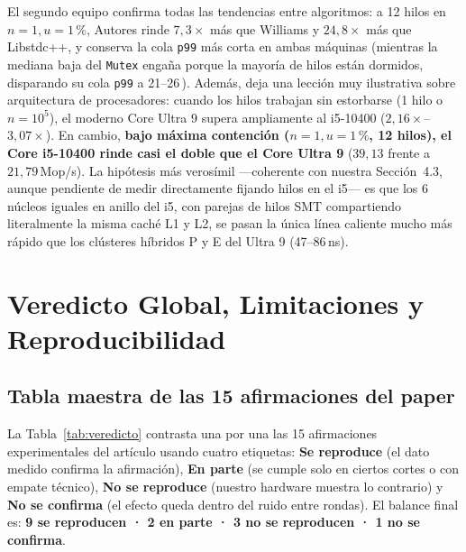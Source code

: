 \documentclass[11pt,a4paper]{article}
\newcommand{\us}{\,\text{\textmu s}}
\begin{document}
El segundo equipo confirma todas las tendencias entre algoritmos: a 12 hilos en $n=1, u=1\,\%$, Autores rinde $7,3\times$ más que Williams y $24,8\times$ más que Libstdc++, y conserva la cola \texttt{p99} más corta en ambas máquinas (mientras la mediana baja del \texttt{Mutex} engaña porque la mayoría de hilos están dormidos, disparando su cola \texttt{p99} a 21--26\us{}). Además, deja una lección muy ilustrativa sobre arquitectura de procesadores: cuando los hilos trabajan sin estorbarse (1 hilo o $n=10^5$), el moderno Core Ultra 9 supera ampliamente al i5-10400 ($2,16\times$--$3,07\times$). En cambio, \textbf{bajo máxima contención ($n=1, u=1\,\%$, 12 hilos), el Core i5-10400 rinde casi el doble que el Core Ultra 9} ($39,13$ frente a $21,79$\,Mop/s). La hipótesis más verosímil —coherente con nuestra Sección~4.3, aunque pendiente de medir directamente fijando hilos en el i5— es que los 6 núcleos iguales en anillo del i5, con parejas de hilos SMT compartiendo literalmente la misma caché L1 y L2, se pasan la única línea caliente mucho más rápido que los clústeres híbridos P y E del Ultra 9 (47--86\,ns).

\section{Veredicto Global, Limitaciones y Reproducibilidad}

\subsection{Tabla maestra de las 15 afirmaciones del paper}
La Tabla~\ref{tab:veredicto} contrasta una por una las 15 afirmaciones experimentales del artículo usando cuatro etiquetas: \textbf{Se reproduce} (el dato medido confirma la afirmación), \textbf{En parte} (se cumple solo en ciertos cortes o con empate técnico), \textbf{No se reproduce} (nuestro hardware muestra lo contrario) y \textbf{No se confirma} (el efecto queda dentro del ruido entre rondas). El balance final es: \textbf{9 se reproducen · 2 en parte · 3 no se reproducen · 1 no se confirma}.
\end{document}

